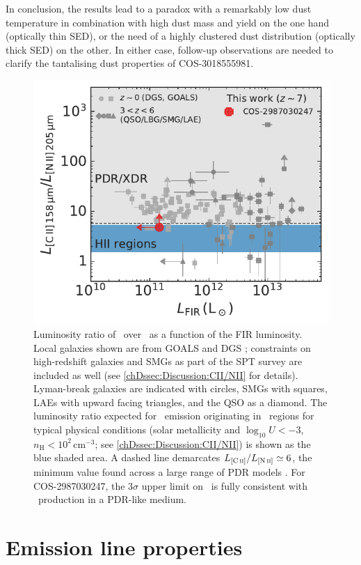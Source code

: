 In conclusion, the results lead to a paradox with a remarkably low dust temperature in combination with high dust mass and yield on the one hand (optically thin SED), or the need of a highly clustered dust distribution (optically thick SED) on the other. In either case, follow-up observations are needed to clarify the tantalising dust properties of COS-3018555981.
\begin{figure}
    \centering
    \includegraphics[width=0.6\linewidth]{"Plots/ChapterD/CII_NII_ratio"}
    \caption[Luminosity ratio of \CII\ over \NII\ as a function of $L_\text{FIR}$.]{Luminosity ratio of \CIILam\ over \NIILam\ as a function of the FIR luminosity. Local galaxies shown are from GOALS \citep{2017ApJ...846...32D} and DGS \citep{2015A&A...578A..53C, 2019A&A...626A..23C}; constraints on high-redshift galaxies \citep{2014ApJ...782L..17D, 2016ApJ...832..151P, 2019ApJ...882..168P} and SMGs as part of the SPT survey \citep{2020MNRAS.494.4090C} are included as well (see \cref{chDssec:Discussion:CII/NII} for details). Lyman-break galaxies are indicated with circles, SMGs with squares, LAEs with upward facing triangles, and the QSO as a diamond. The luminosity ratio expected for \CII\ emission originating in \HII\ regions for typical physical conditions (solar metallicity and $\log_{10} U < -3$, $n_\text{H} < 10^2 \, \mathrm{cm^{-3}}$; see \cref{chDssec:Discussion:CII/NII}) is shown as the blue shaded area. A dashed line demarcates $L_\CII/L_\NII \simeq 6$, the minimum value found across a large range of PDR models \citep[grey shaded area; a similar neutral medium can be created in the presence of XDRs or shocked gas, see e.g.][]{2014ApJ...782L..17D}. For COS-2987030247, the $3 \sigma$ upper limit on \NII\ is fully consistent with \CII\ production in a PDR-like medium.
    }
    \label{chDfig:CII/NII_ratio}
\end{figure}

\section{Emission line properties}
\label{chDsec:Discussion:Emission_line_properties}

